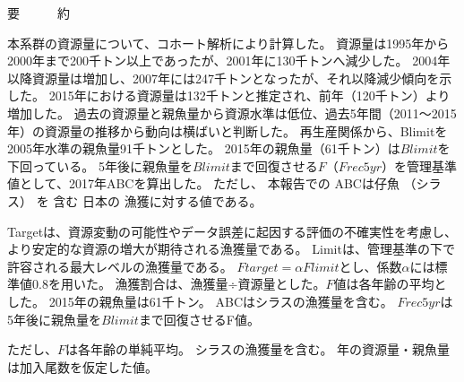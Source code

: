 \begin{center}\Large{{\gt 要　　　約}}\end{center}
本系群の資源量について、コホート解析により計算した。
資源量は1995年から2000年まで200千トン以上であったが、2001年に130千トンへ減少した。
2004年以降資源量は増加し、2007年には247千トンとなったが、それ以降減少傾向を示した。
2015年における資源量は132千トンと推定され、前年（120千トン）より増加した。
過去の資源量と親魚量から資源水準は低位、過去5年間（2011～2015年）の資源量の推移から動向は横ばいと判断した。
再生産関係から、Blimitを2005年水準の親魚量91千トンとした。
2015年の親魚量（61千トン）は$Blimit$を下回っている。%
5年後に親魚量を$Blimit$まで回復させる$F$（$Frec5yr$）を管理基準値として、2017年ABCを算出した。
ただし、
本報告での
ABCは仔魚
（シラス）
を
含む
日本の
漁獲に対する値である。%

Targetは、資源変動の可能性やデータ誤差に起因する評価の不確実性を考慮し、%
より安定的な資源の増大が期待される漁獲量である。
Limitは、管理基準の下で許容される最大レベルの漁獲量である。
$Ftarget = \alpha Flimit$とし、係数$\alpha$には標準値0.8を用いた。
漁獲割合は、漁獲量÷資源量とした。$F$値は各年齢の平均とした。
2015年の親魚量は61千トン。
ABCはシラスの漁獲量を含む。
$Frec5yr$は5年後に親魚量を$Blimit$まで回復させるF値。

ただし、$F$は各年齢の単純平均。
シラスの漁獲量を含む。
\thisyrad 年の資源量・親魚量は加入尾数を仮定した値。%
